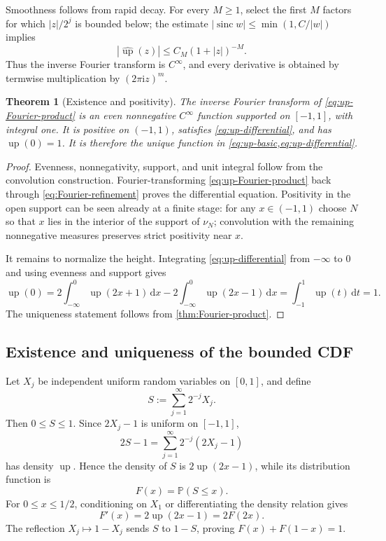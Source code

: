 \documentclass[11pt]{article}
\numberwithin{equation}{section}
\newtheorem{theorem}{Theorem}[section]
\theoremstyle{definition}
\theoremstyle{remark}
\newcommand{\upf}{\operatorname{up}}
\newcommand{\sinc}{\operatorname{sinc}}
\newcommand{\dd}{\,\mathrm d}
\newcommand{\ii}{\mathrm i}
\begin{document}
Smoothness follows from rapid decay.  For every $M\ge1$, select the first $M$ factors for which $|z|/2^j$ is bounded below; the estimate $|\sinc w|\le\min(1,C/|w|)$ implies
\begin{equation}\label{eq:rapid-decay}
 |\widehat{\upf}(z)|\le C_M(1+|z|)^{-M}.
\end{equation}
Thus the inverse Fourier transform is $C^\infty$, and every derivative is obtained by termwise multiplication by $(2\pi\ii z)^m$.

\begin{theorem}[Existence and positivity]\label{thm:existence-positivity}
The inverse Fourier transform of \eqref{eq:up-Fourier-product} is an even nonnegative $C^\infty$ function supported on $[-1,1]$, with integral one.  It is positive on $(-1,1)$, satisfies \eqref{eq:up-differential}, and has $\upf(0)=1$.  It is therefore the unique function in \cref{eq:up-basic,eq:up-differential}.
\end{theorem}

\begin{proof}
Evenness, nonnegativity, support, and unit integral follow from the convolution construction.  Fourier-transforming \eqref{eq:up-Fourier-product} back through \eqref{eq:Fourier-refinement} proves the differential equation.  Positivity in the open support can be seen already at a finite stage: for any $x\in(-1,1)$ choose $N$ so that $x$ lies in the interior of the support of $\nu_N$; convolution with the remaining nonnegative measures preserves strict positivity near $x$.

It remains to normalize the height.  Integrating \eqref{eq:up-differential} from $-\infty$ to $0$ and using evenness and support gives
\[
 \upf(0)=2\int_{-\infty}^{0}\upf(2x+1)\dd x
       -2\int_{-\infty}^{0}\upf(2x-1)\dd x
       =\int_{-1}^{1}\upf(t)\dd t=1.
\]
The uniqueness statement follows from \cref{thm:Fourier-product}.
\end{proof}

\subsection{Existence and uniqueness of the bounded CDF}

Let $X_j$ be independent uniform random variables on $[0,1]$, and define
\begin{equation}\label{eq:random-S}
 S:=\sum_{j=1}^{\infty}2^{-j}X_j.
\end{equation}
Then $0\le S\le1$.  Since $2X_j-1$ is uniform on $[-1,1]$,
\[
 2S-1=\sum_{j=1}^{\infty}2^{-j}(2X_j-1)
\]
has density $\upf$.  Hence the density of $S$ is $2\upf(2x-1)$, while its distribution function is
\begin{equation}\label{eq:F-probability}
 F(x)=\mathbb P(S\le x).
\end{equation}
For $0\le x\le1/2$, conditioning on $X_1$ or differentiating the density relation gives
\[
 F'(x)=2\upf(2x-1)=2F(2x).
\]
The reflection $X_j\mapsto1-X_j$ sends $S$ to $1-S$, proving $F(x)+F(1-x)=1$.
\end{document}
